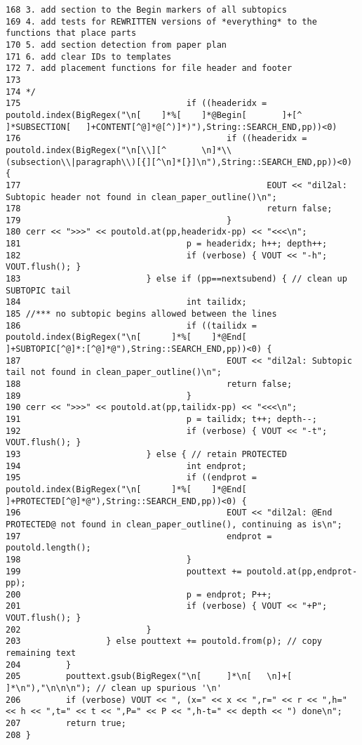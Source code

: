 \begin{verbatim}
168 3. add section to the Begin markers of all subtopics
169 4. add tests for REWRITTEN versions of *everything* to the functions that place parts
170 5. add section detection from paper plan
171 6. add clear IDs to templates
172 7. add placement functions for file header and footer
173 
174 */
175                                 if ((headeridx = poutold.index(BigRegex("\n[    ]*%[    ]*@Begin[       ]+[^    ]*SUBSECTION[   ]+CONTENT[^@]*@[^)]*)"),String::SEARCH_END,pp))<0)
176                                         if ((headeridx = poutold.index(BigRegex("\n[\\][^       \n]*\\(subsection\\|paragraph\\)[{][^\n]*[}]\n"),String::SEARCH_END,pp))<0) {
177                                                 EOUT << "dil2al: Subtopic header not found in clean_paper_outline()\n";
178                                                 return false;
179                                         }
180 cerr << ">>>" << poutold.at(pp,headeridx-pp) << "<<<\n";
181                                 p = headeridx; h++; depth++;
182                                 if (verbose) { VOUT << "-h"; VOUT.flush(); }
183                         } else if (pp==nextsubend) { // clean up SUBTOPIC tail
184                                 int tailidx;
185 //*** no subtopic begins allowed between the lines
186                                 if ((tailidx = poutold.index(BigRegex("\n[      ]*%[    ]*@End[         ]+SUBTOPIC[^@]*:[^@]*@"),String::SEARCH_END,pp))<0) {
187                                         EOUT << "dil2al: Subtopic tail not found in clean_paper_outline()\n";
188                                         return false;
189                                 }
190 cerr << ">>>" << poutold.at(pp,tailidx-pp) << "<<<\n";
191                                 p = tailidx; t++; depth--;
192                                 if (verbose) { VOUT << "-t"; VOUT.flush(); }
193                         } else { // retain PROTECTED
194                                 int endprot;
195                                 if ((endprot = poutold.index(BigRegex("\n[      ]*%[    ]*@End[         ]+PROTECTED[^@]*@"),String::SEARCH_END,pp))<0) {
196                                         EOUT << "dil2al: @End PROTECTED@ not found in clean_paper_outline(), continuing as is\n";
197                                         endprot = poutold.length();
198                                 }
199                                 pouttext += poutold.at(pp,endprot-pp);
200                                 p = endprot; P++;
201                                 if (verbose) { VOUT << "+P"; VOUT.flush(); }
202                         }
203                 } else pouttext += poutold.from(p); // copy remaining text
204         }
205         pouttext.gsub(BigRegex("\n[     ]*\n[   \n]+[   ]*\n"),"\n\n\n"); // clean up spurious '\n'
206         if (verbose) VOUT << ", (x=" << x << ",r=" << r << ",h=" << h << ",t=" << t << ",P=" << P << ",h-t=" << depth << ") done\n";
207         return true;
208 }
\end{verbatim}\normalsize 
